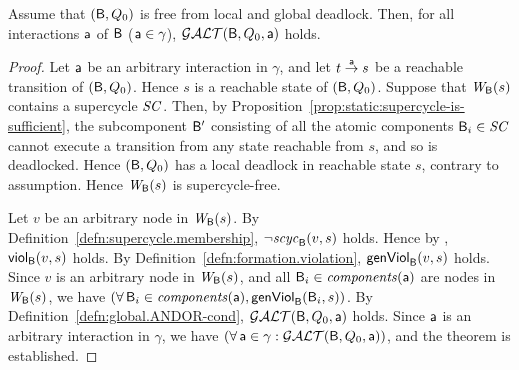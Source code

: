 \begin{theorem}
\label{theorem:gao-is-complete}
Assume that $(\B,Q_0)$ is free from local and global deadlock. 
Then,  for all interactions $\act$ of $\B$ (\ie $\act \in \gamma$), 
$\GAO(\B,Q_0,\act)$ holds.
\end{theorem}
%
\begin{proof}
Let $\act$ be an arbitrary interaction in $\gamma$, and let 
$t \goesto[\act] s$ be a reachable transition of $(\B, Q_0)$.
Hence $s$ is a reachable state of $(\B,Q_0)$.
Suppose that $\wfg{\B}{s}$ contains a supercycle $\SC$. Then, by 
Proposition~\ref{prop:static:supercycle-is-sufficient}, the
subcomponent $\B'$ consisting of all the atomic components $\B_i \in \SC$
cannot execute a transition from any state reachable from $s$, and so is deadlocked.
Hence $(\B,Q_0)$ has a local deadlock in reachable state $s$, contrary to assumption.
Hence $\wfg{\B}{s}$ is supercycle-free.

Let $v$ be an arbitrary node in $\wfg{\B}{s}$.
By Definition~\ref{defn:supercycle.membership}, $\neg \scyc{\B}{s}{v}$ holds.
Hence by , $\scV{v}{s}$ holds.
By Definition~\ref{defn:formation.violation},  $\genViol{v}{s}$ holds.
Since $v$ is an arbitrary node in $\wfg{\B}{s}$, and all $\B_i \in \comps{\act}$ are nodes in 
$\wfg{\B}{s}$, we have $(\fas \B_i \in \comps{\act}, \formViol{\B_i}{s})$.
By Definition~\ref{defn:global.ANDOR-cond}, $\GAO(\B, Q_0, \act)$ holds.
Since $\act$ is an arbitrary interaction in $\gamma$, we have
$(\fas \act \in \gamma: \GAO(\B,Q_0,\act))$, and the theorem is established.
\end{proof}
